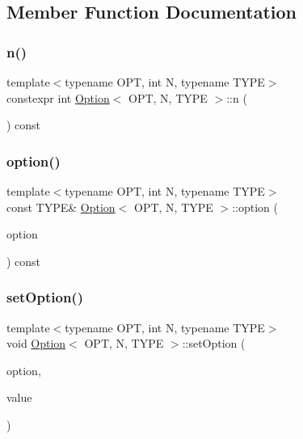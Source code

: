 \subsection{Member Function Documentation}
\mbox{\label{class_option_abe20a0d528e8865dcb52a788ee4f161f}} 
\subsubsection{\texorpdfstring{n()}{n()}}
{\footnotesize\ttfamily template$<$typename O\+PT, int N, typename T\+Y\+PE$>$ \\
constexpr int \mbox{\hyperlink{class_option}{Option}}$<$ O\+PT, N, T\+Y\+PE $>$\+::n (\begin{DoxyParamCaption}{ }\end{DoxyParamCaption}) const\hspace{0.3cm}{\ttfamily [inline]}}

\mbox{\label{class_option_ab934f091ca5f7f68ce17fb063156df21}} 
\subsubsection{\texorpdfstring{option()}{option()}}
{\footnotesize\ttfamily template$<$typename O\+PT, int N, typename T\+Y\+PE$>$ \\
const T\+Y\+PE\& \mbox{\hyperlink{class_option}{Option}}$<$ O\+PT, N, T\+Y\+PE $>$\+::option (\begin{DoxyParamCaption}\item[{O\+PT}]{option }\end{DoxyParamCaption}) const\hspace{0.3cm}{\ttfamily [inline]}}

\mbox{\label{class_option_a1b2d388b3af25fe8e71e595f2b016d43}} 
\subsubsection{\texorpdfstring{setOption()}{setOption()}\hspace{0.1cm}{\footnotesize\ttfamily [1/2]}}
{\footnotesize\ttfamily template$<$typename O\+PT, int N, typename T\+Y\+PE$>$ \\
void \mbox{\hyperlink{class_option}{Option}}$<$ O\+PT, N, T\+Y\+PE $>$\+::set\+Option (\begin{DoxyParamCaption}\item[{O\+PT}]{option,  }\item[{T\+Y\+PE}]{value }\end{DoxyParamCaption})\hspace{0.3cm}{\ttfamily [inline]}}


